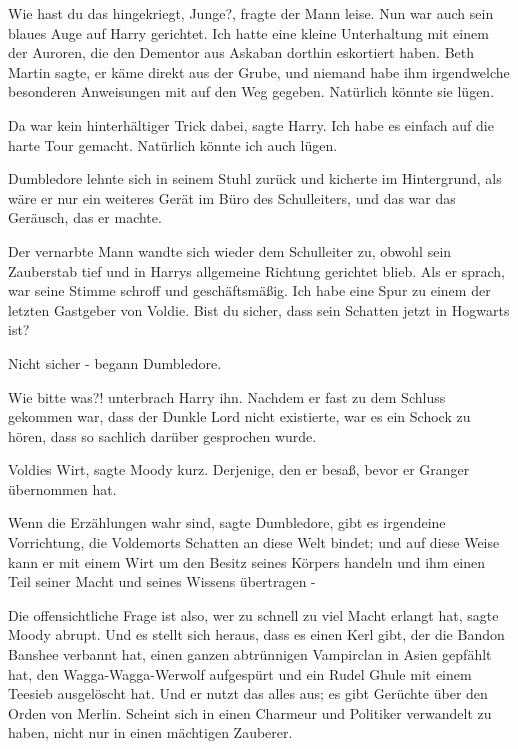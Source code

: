 \glqq Wie hast du das hingekriegt, Junge?\grqq{}, fragte der Mann leise. Nun war
auch sein blaues Auge auf Harry gerichtet. \glqq Ich hatte eine kleine
Unterhaltung mit einem der Auroren, die den Dementor aus Askaban dorthin
eskortiert haben. Beth Martin sagte, er käme direkt aus der Grube, und niemand
habe ihm irgendwelche besonderen Anweisungen mit auf den Weg gegeben. Natürlich
könnte sie lügen.\grqq{}

\glqq Da war kein hinterhältiger Trick dabei\grqq{}, sagte Harry. \glqq Ich habe
es einfach auf die harte Tour gemacht. Natürlich könnte ich auch lügen.\grqq{}

Dumbledore lehnte sich in seinem Stuhl zurück und kicherte im Hintergrund, als
wäre er nur ein weiteres Gerät im Büro des Schulleiters, und das war das
Geräusch, das er machte.

Der vernarbte Mann wandte sich wieder dem Schulleiter zu, obwohl sein Zauberstab
tief und in Harrys allgemeine Richtung gerichtet blieb. Als er sprach, war seine
Stimme schroff und geschäftsmäßig. \glqq Ich habe eine Spur zu einem der letzten
Gastgeber von Voldie. Bist du sicher, dass sein Schatten jetzt in Hogwarts
ist?\grqq{}

\glqq Nicht sicher -\grqq{} begann Dumbledore.

\glqq Wie bitte was?!\grqq{} unterbrach Harry ihn. Nachdem er fast zu dem
Schluss gekommen war, dass der Dunkle Lord nicht existierte, war es ein Schock
zu hören, dass so sachlich darüber gesprochen wurde.

\glqq Voldies Wirt\grqq{}, sagte Moody kurz. \glqq Derjenige, den er besaß,
bevor er Granger übernommen hat.\grqq{}

\glqq Wenn die Erzählungen wahr sind\grqq{}, sagte Dumbledore, \glqq gibt es
irgendeine Vorrichtung, die Voldemorts Schatten an diese Welt bindet; und auf
diese Weise kann er mit einem Wirt um den Besitz seines Körpers handeln und ihm
einen Teil seiner Macht und seines Wissens übertragen -\grqq{}

\glqq Die offensichtliche Frage ist also, wer zu schnell zu viel Macht erlangt
hat\grqq{}, sagte Moody abrupt. \glqq Und es stellt sich heraus, dass es einen
Kerl gibt, der die Bandon Banshee verbannt hat, einen ganzen abtrünnigen
Vampirclan in Asien gepfählt hat, den Wagga-Wagga-Werwolf aufgespürt und ein
Rudel Ghule mit einem Teesieb ausgelöscht hat. Und er nutzt das alles aus; es
gibt Gerüchte über den Orden von Merlin. Scheint sich in einen Charmeur und
Politiker verwandelt zu haben, nicht nur in einen mächtigen Zauberer.\grqq{}

